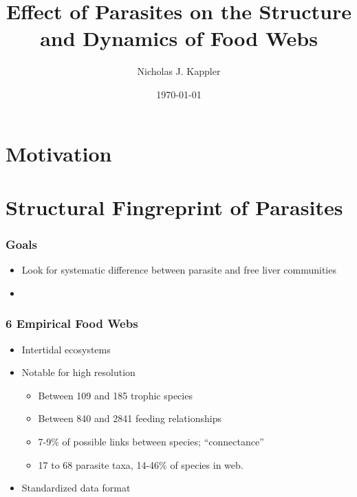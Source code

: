 \documentclass[table]{beamer}
\title{Effect of Parasites on the Structure and Dynamics of Food Webs}
\author{Nicholas J. Kappler}
\date{\today}
\begin{document}
\frame{\titlepage}

\section[Outline]{}
\frame{\tableofcontents}

\section{Motivation}

\section{Structural Fingreprint of Parasites}

\begin{frame}
    \frametitle{Goals}
    \begin{itemize}[<+->]
        \item Look for systematic difference between parasite and free liver
            communities
        \item 
    \end{itemize}

\end{frame}

\begin{frame}
    \frametitle{6 Empirical Food Webs}
    \begin{itemize}[<+->]
        \item Intertidal ecosystems
        \item Notable for high resolution
            \begin{itemize}
                \item Between 109 and 185 trophic species 
                \item Between 840 and 2841 feeding relationships
                \item 7-9\% of possible links between species;
                    ``connectance''
                \item 17 to 68 parasite taxa, 14-46\% of species in web.
            \end{itemize}
        \item Standardized data format
    \end{itemize}
\end{frame}
\end{document}
